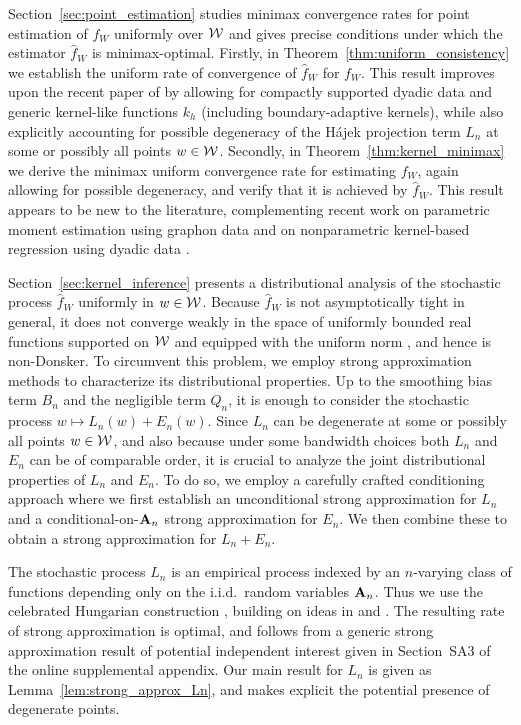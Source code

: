 Section~\ref{sec:point_estimation} studies minimax convergence rates for point
estimation of $f_W$ uniformly over $\mathcal{W}$ and gives precise conditions under
which the estimator $\widehat{f}_W$ is minimax-optimal.
Firstly, in Theorem~\ref{thm:uniform_consistency} we establish the uniform rate
of convergence of $\widehat{f}_W$ for $f_W$. This result improves upon the
recent paper of \citet{chiang2020empirical} by allowing
for compactly supported dyadic data and
generic kernel-like functions $k_h$ (including boundary-adaptive kernels), while
also explicitly accounting for possible degeneracy of the
H\'{a}jek projection term $L_n$ at some or possibly all points $w\in\mathcal{W}$.
Secondly, in Theorem~\ref{thm:kernel_minimax} we derive the
minimax uniform convergence rate for estimating
$f_W$, again allowing for possible degeneracy,
and verify that it is achieved by $\widehat f_W$.
This result appears to be new to the literature,
complementing recent work on parametric moment estimation
using graphon data \citep{gao2021minimax} and on nonparametric
kernel-based regression using dyadic data \citep{graham2021dyadicregression}.

Section~\ref{sec:kernel_inference} presents a distributional analysis of
the stochastic process $\widehat{f}_W$ uniformly in $w \in \mathcal{W}$. Because
$\widehat{f}_W$ is not asymptotically tight in general, it
does not converge
weakly in the space of uniformly bounded real functions supported on $\mathcal{W}$ and
equipped with the uniform norm \citep{van1996weak},
and hence is non-Donsker.
To circumvent this problem,
we employ strong approximation methods to characterize
its distributional properties.
Up to the smoothing bias term $B_n$ and the negligible term $Q_n$,
it is enough to consider
the stochastic process $w \mapsto L_n(w)+E_n(w)$.
Since $L_n$ can be degenerate at some or possibly all points $w\in\mathcal{W}$, and also
because under some bandwidth choices both $L_n$ and $E_n$ can be of comparable
order, it is crucial to analyze the joint distributional properties of $L_n$ and
$E_n$. To do so, we employ a carefully crafted conditioning approach where we
first establish an unconditional strong approximation for $L_n$ and a
conditional-on-$\mathbf{A}_n$ strong approximation for $E_n$.
We then combine these to obtain a strong approximation for $L_n+E_n$.

The stochastic process $L_n$ is an empirical process indexed by an $n$-varying
class of functions depending only on the i.i.d.\ random variables $\mathbf{A}_n$. Thus
we use the celebrated Hungarian
construction \citep{komlos1975approximation}, building on ideas in
\citet{gine2004kernel} and \citet{gine2010confidence}. The resulting rate of
strong approximation is optimal, and follows from a generic strong approximation
result of potential independent interest given in
Section~SA3 of
the online supplemental appendix.
Our main result for $L_n$ is given as Lemma~\ref{lem:strong_approx_Ln},
and makes explicit the potential presence of degenerate points.

